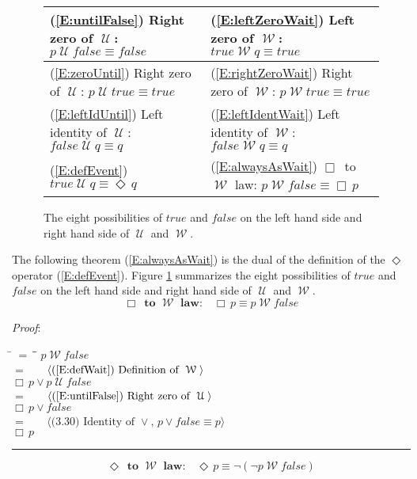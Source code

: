 \documentclass[12pt, fleqn, leqno]{article}
\newcommand{\lgap}{2pt}                             %
\newcommand{\mymathindent}{24pt}                    %
\newcommand{\Until}{\;\mathcal{U}\;}
\newcommand{\Wait}{\;\mathcal{W}\;}
\newcommand{\Event}{\Diamond\,}
\newcommand{\Always}{\Box\,}
\newcommand{\myqed}{\rule[-.23ex]{1.2ex}{2.0ex}}
\newcommand{\myqedtab}{\hspace{384pt}}              %
\newcommand{\Gll} {\langle}                         %
\newcommand{\Ggg} {\rangle}                         %
\newcommand{\Hint}[1]     {\ \ \ $\Gll              \mbox{#1} \Ggg$ }   %
\begin{document}
\begin{figure}[t]
\centering
\renewcommand\arraystretch{1.2}
\begin{tabular}{ l l }
  \toprule
  (\ref{E:untilFalse}) Right zero of $\Until$:\; $p \Until false \equiv false$
  &
  (\ref{E:leftZeroWait}) Left zero of $\Wait$:\; $true \Wait q \equiv true$ \\
  \midrule
  (\ref{E:zeroUntil}) Right zero of $\Until$:\; $p \Until true \equiv true$
  &
  (\ref{E:rightZeroWait}) Right zero of $\Wait$:\; $p \Wait true \equiv true$ \\
  \midrule
  (\ref{E:leftIdUntil}) Left identity of $\Until$:\; $false \Until q \equiv q$
  &
  (\ref{E:leftIdentWait}) Left identity of $\Wait$:\; $false \Wait q \equiv q$ \\
  \midrule
  (\ref{E:defEvent}) $true \Until q \equiv \Event q$
  &
  (\ref{E:alwaysAsWait}) $\Always$ to $\Wait$ law:\; $p \Wait false\equiv \Always p$ \\
  \bottomrule
\end{tabular}
\renewcommand\arraystretch{1}
\caption{The eight possibilities of $true$ and $false$ on the left hand side and right hand side of $\Until$ and $\Wait$.
\label{true-false-wait-until}}
\end{figure}

The following theorem (\ref{E:alwaysAsWait}) is the dual of the definition of the $\Event$ operator (\ref{E:defEvent}).
Figure \ref{true-false-wait-until} summarizes the eight possibilities of $true$ and $false$ on the left hand side and right hand side of $\Until$ and $\Wait$.
\begin{equation}\label{E:alwaysAsWait}
\textbf{$\Always$ to $\Wait$ law:}\quad \Always p \equiv p \Wait false
\end{equation}

\emph{Proof}:
\begin{tabbing}
\hspace{\mymathindent} \= $= \;$ \= \myqedtab \= \kill
\> \> $p \Wait false$\\[\lgap]
\> $=$ \> \Hint{(\ref{E:defWait}) Definition of $\Wait$} \\[\lgap]
\> \> $\Always p\lor p \Until false$\\[\lgap]
\> $=$ \> \Hint{(\ref{E:untilFalse}) Right zero of $\Until$} \\[\lgap]
\> \> $\Always p\lor false$\\[\lgap]
\> $=$ \> \Hint{(3.30) Identity of $\lor$, $p\lor false\equiv p$} \\[\lgap]
\> \> $\Always p$ \quad \myqed
\end{tabbing}
\begin{equation}\label{E:eventAsWait}
\textbf{$\Event$ to $\Wait$ law:}\quad \Event p \equiv \neg(\neg p \Wait false)
\end{equation}
\end{document}
